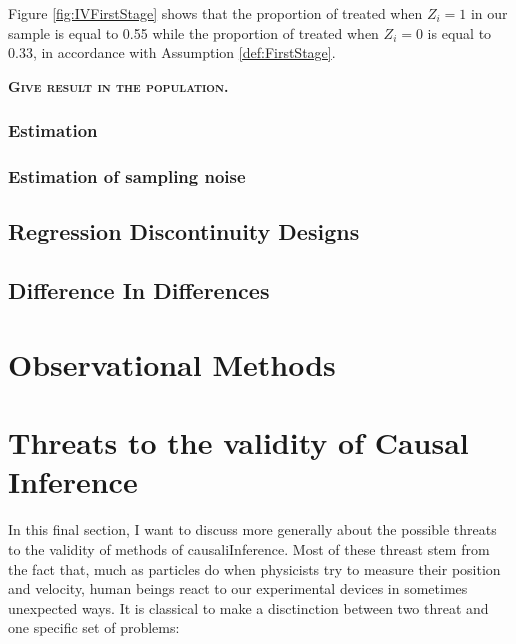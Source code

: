 \documentclass[]{book}
\theoremstyle{definition}
\theoremstyle{definition}
\theoremstyle{definition}
\theoremstyle{remark}
\begin{document}
Figure \ref{fig:IVFirstStage} shows that the proportion of treated when \(Z_i=1\) in our sample is equal to 0.55 while the proportion of treated when \(Z_i=0\) is equal to 0.33, in accordance with Assumption \ref{def:FirstStage}.

\textbf{\textsc{Give result in the population.}}

\hypertarget{estimation}{%
\subsection{Estimation}\label{estimation}}

\hypertarget{estimation-of-sampling-noise}{%
\subsection{Estimation of sampling noise}\label{estimation-of-sampling-noise}}

\hypertarget{regression-discontinuity-designs}{%
\section{Regression Discontinuity Designs}\label{regression-discontinuity-designs}}

\hypertarget{difference-in-differences}{%
\section{Difference In Differences}\label{difference-in-differences}}

\hypertarget{sec:OM}{%
\chapter{Observational Methods}\label{sec:OM}}

\hypertarget{sec:threats}{%
\chapter{Threats to the validity of Causal Inference}\label{sec:threats}}

In this final section, I want to discuss more generally about the possible threats to the validity of methods of causaliInference.
Most of these threast stem from the fact that, much as particles do when physicists try to measure their position and velocity, human beings react to our experimental devices in sometimes unexpected ways.
It is classical to make a disctinction between two threat and one specific set of problems:
\end{document}
